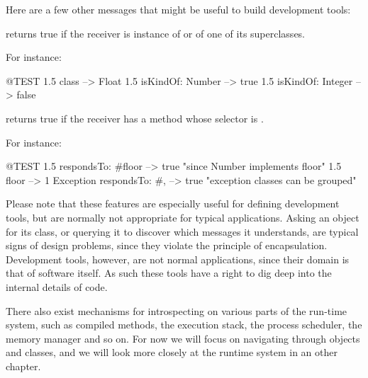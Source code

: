 \documentclass[a4paper,10pt,twoside]{book}
\begin{document}
Here are a few other messages that might be useful to build development tools:


 returns true if the receiver is instance of  or of one of its superclasses.

For instance:
\begin{code}{@TEST}
1.5 class                     --> Float
1.5 isKindOf: Number --> true
1.5 isKindOf: Integer   --> false
\end{code}


 returns true if the receiver has a method whose selector is .

For instance:
\begin{code}{@TEST}
1.5 respondsTo: #floor      --> true    "since Number implements floor"
1.5 floor                            --> 1
Exception respondsTo: #, --> true    "exception classes can be grouped"
\end{code}

Please note that these features are especially useful for defining development tools, but are normally not appropriate for typical applications.
Asking an object for its class, or querying it to discover which messages it understands, are typical signs of design problems, since they violate the principle of encapsulation.
Development tools, however, are not normal applications, since their domain is that of software itself. As such these tools have a right to dig deep into the internal details of code.



There also exist mechanisms for introspecting on various parts of the run-time system, such as compiled methods, the execution stack, the process scheduler, the memory manager and so on. For now we will focus on navigating through objects and classes, and we will look more closely at the runtime system in an other chapter.

\end{document}
